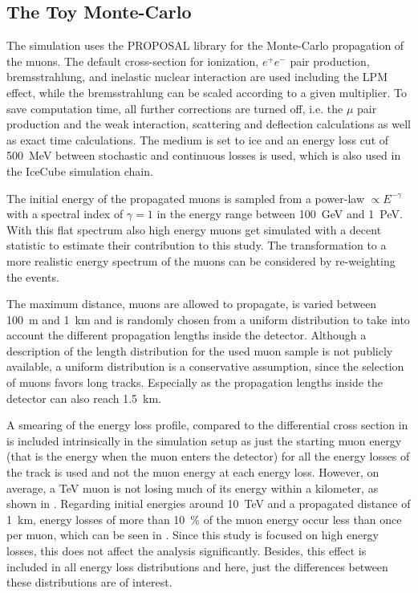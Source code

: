 %

\subsection{The Toy Monte-Carlo}

The simulation uses the PROPOSAL library for the Monte-Carlo propagation of the muons.
The default cross-section for ionization, $e^+e^-$ pair production, bremsstrahlung, and inelastic nuclear interaction are used including the LPM effect, while the bremsstrahlung can be scaled according to a given multiplier.
To save computation time, all further corrections are turned off, i.e. the $\mu$ pair production and the weak interaction, scattering and deflection calculations as well as exact time calculations.
The medium is set to ice and an energy loss cut of \SI{500}{MeV} between stochastic and continuous losses is used, which is also used in the IceCube simulation chain.

The initial energy of the propagated muons is sampled from a power-law $\propto E^{-\gamma}$ with a spectral index of $\gamma=1$ in the energy range between \SI{100}{GeV} and \SI{1}{PeV}.
With this flat spectrum also high energy muons get simulated with a decent statistic to estimate their contribution to this study.
The transformation to a more realistic energy spectrum of the muons can be considered by re-weighting the events.

The maximum distance, muons are allowed to propagate, is varied between \SI{100}{m} and \SI{1}{km} and is randomly chosen from a uniform distribution to take into account the different propagation lengths inside the detector.
Although a description of the length distribution for the used muon sample is not publicly available, a uniform distribution is a conservative assumption, since the selection of muons favors long tracks.
Especially as the propagation lengths inside the detector can also reach \SI{1.5}{km}.

A smearing of the energy loss profile, compared to the differential cross section in  is included intrinsically in the simulation setup as just the starting muon energy (that is the energy when the muon enters the detector) for all the energy losses of the track is used and not the muon energy at each energy loss.
However, on average, a TeV muon is not losing much of its energy within a kilometer, as shown in .
Regarding initial energies around \SI{10}{TeV} and a propagated distance of \SI{1}{km}, energy losses of more than \SI{10}{\%} of the muon energy occur less than once per muon, which can be seen in .
Since this study is focused on high energy losses, this does not affect the analysis significantly. 
Besides, this effect is included in all energy loss distributions and here, just the differences between these distributions are of interest.

